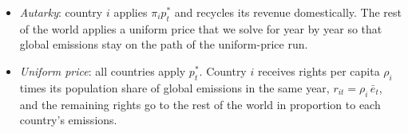 \documentclass[12pt,english]{article}
\theoremstyle{remark}
\begin{document}
\begin{itemize}
  \item \emph{Autarky}: country $i$ applies $\pi_i p^*_t$ and recycles its revenue domestically. The rest of the world applies a uniform price that we solve for year by year so that global emissions stay on the path of the uniform-price run. 
  \item \emph{Uniform price}: all countries apply $p^*_t$. Country $i$ receives rights per capita $\rho_i$ times its population share of global emissions in the same year, $r_{it}=\rho_i\,\bar e_t$, %
  and the remaining rights go to the rest of the world in proportion to each country's emissions. 
\end{itemize}
\end{document}
